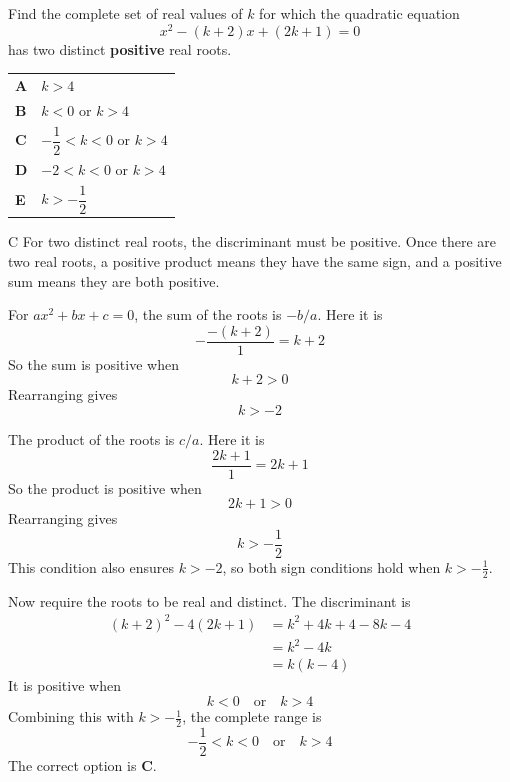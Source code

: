 \documentclass[11pt,a4paper]{article}
\begin{document}
\begin{enumerate}[label=\textbf{\arabic*.},leftmargin=*,itemsep=0pt,start=10]
\questionitem[Polynomials]
Find the complete set of real values of $k$ for which the quadratic equation
\[
x^2 - (k+2)x + (2k+1) = 0
\]
has two distinct \textbf{positive} real roots.

\par\vspace*{12pt}
\begin{tabularx}{\linewidth}{@{}>{\bfseries}l Y@{}}
A &
$k > 4$
\\[0.8em]
B &
$k < 0$ or $k > 4$
\\[0.8em]
C &
$-\dfrac{1}{2} < k < 0$ or $k > 4$
\\[0.8em]
D &
$-2 < k < 0$ or $k > 4$
\\[0.8em]
E &
$k > -\dfrac{1}{2}$
\\
\end{tabularx}

\begin{djsSolution}{C}
For two distinct real roots, the discriminant must be positive. Once there are two real roots, a positive product means they have the same sign, and a positive sum means they are both positive.

For $ax^2+bx+c=0$, the sum of the roots is $-b/a$. Here it is
\[
-\frac{-(k+2)}{1}=k+2
\]
So the sum is positive when
\[
k+2>0
\]
Rearranging gives
\[
k>-2
\]

The product of the roots is $c/a$. Here it is
\[
\frac{2k+1}{1}=2k+1
\]
So the product is positive when
\[
2k+1>0
\]
Rearranging gives
\[
k>-\frac12
\]
This condition also ensures $k>-2$, so both sign conditions hold when $k>-\frac12$.

Now require the roots to be real and distinct. The discriminant is
\[
\begin{aligned}
(k+2)^2-4(2k+1)
&=k^2+4k+4-8k-4\\
&=k^2-4k\\
&=k(k-4)
\end{aligned}
\]
It is positive when
\[
k<0\quad\text{or}\quad k>4
\]
Combining this with $k>-\frac12$, the complete range is
\[
-\frac12<k<0\quad\text{or}\quad k>4
\]
The correct option is \textbf{C}.\\[5pt]


\end{djsSolution}
\end{enumerate}
\end{document}
